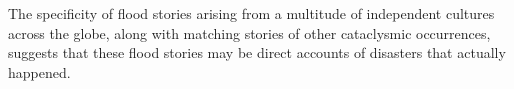 \documentclass[10pt,twocolumn,letterpaper]{article}
\begin{document}

The specificity of flood stories arising from a multitude of independent cultures across the globe, along with matching stories of other cataclysmic occurrences, suggests that these flood stories may be direct accounts of disasters that actually happened.
\end{document}
